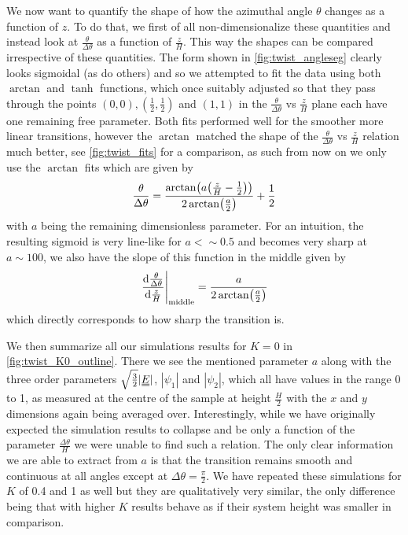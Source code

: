 \documentclass[12pt]{article}
\newcommand{\duf}[2]{\stackunder[0.5pt]{\stackunder[0.8pt]{\stackunder[1pt]{\ensuremath{#1}}{\rule{\widthof{\ensuremath{#2}}*\real{0.9}}{.1ex}}}{\rule{\widthof{\ensuremath{#2}}*\real{0.9}}{.1ex}}}{}}
\newcommand{\du}[1]{\duf{#1}{#1}}
\newcommand{\EE}{\ensuremath{\du{E}}}
\begin{document}
        We now want to quantify the shape of how the azimuthal angle $\theta$ changes as a function of $z$.
        To do that, we first of all non-dimensionalize these quantities and instead look at $\frac{\theta}{\Delta\theta}$ as a function of $\frac{z}{H}$.
        This way the shapes can be compared irrespective of these quantities.
        The form shown in \cref{fig:twist_angleseg} clearly looks sigmoidal (as do others) and so we attempted to fit the data using both $\arctan$ and $\tanh$ functions, which once suitably adjusted so that they pass through the points $(0, 0), (\frac{1}{2}, \frac{1}{2})$ and $(1, 1)$ in the $\frac{\theta}{\Delta\theta}$ vs $\frac{z}{H}$ plane each have one remaining free parameter.
        Both fits performed well for the smoother more linear transitions, however the $\arctan$ matched the shape of the $\frac{\theta}{\Delta\theta}$ vs $\frac{z}{H}$ relation much better, see \cref{fig:twist_fits} for a comparison, as such from now on we only use the $\arctan$ fits which are given by
        \begin{equation}\label{eq:fit}
            \frac{\theta}{\Delta\theta} = \frac{\arctan(a \qty(\frac{z}{H} - \frac{1}{2}))}{2\arctan(\frac{a}{2})} + \frac{1}{2}
        \end{equation}
        with $a$ being the remaining dimensionless parameter.
        For an intuition, the resulting sigmoid is very line-like for $a < {\sim}0.5$ and becomes very sharp at $a\sim100$, we also have the slope of this function in the middle given by
        \begin{equation}
            \eval{\dv{\frac{\theta}{\Delta\theta}}{\frac{z}{H}}}_\text{middle} = \frac{a}{2\arctan(\frac{a}{2})}
        \end{equation}
        which directly corresponds to how sharp the transition is.

        We then summarize all our simulations results for $K=0$ in \cref{fig:twist_K0_outline}.
        There we see the mentioned parameter $a$ along with the three order parameters $\sqrt{\frac{3}{2}}|\EE|$, $|\psi_1|$ and $|\psi_2|$, which all have values in the range 0 to 1, as measured at the centre of the sample at height $\frac{H}{2}$ with the $x$ and $y$ dimensions again being averaged over.
        Interestingly, while we have originally expected the simulation results to collapse and be only a function of the parameter $\frac{\Delta\theta}{H}$ we were unable to find such a relation.
        The only clear information we are able to extract from $a$ is that the transition remains smooth and continuous at all angles except at $\Delta\theta =\frac{\pi}{2}$.
        We have repeated these simulations for $K$ of 0.4 and 1 as well but they are qualitatively very similar, the only difference being that with higher $K$ results behave as if their system height was smaller in comparison.
\end{document}
